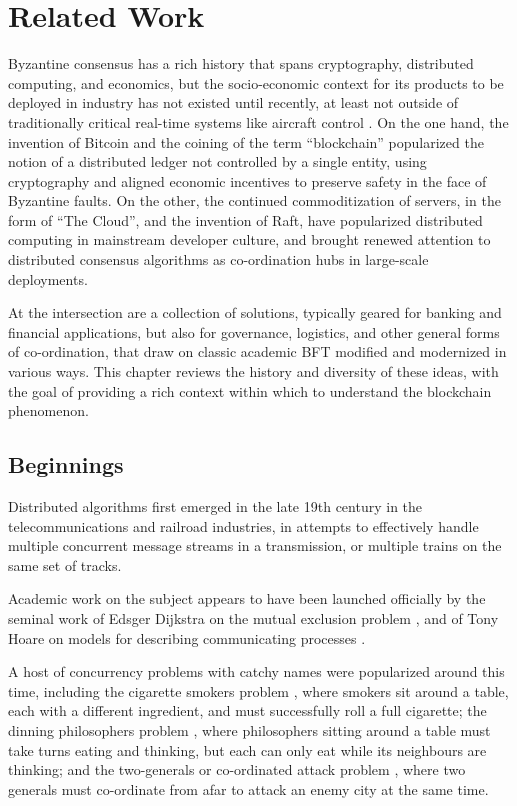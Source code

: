 \chapter{Related Work}
\label{ch:related}

Byzantine consensus has a rich history that spans cryptography, distributed computing, and economics,
but the socio-economic context for its products to be deployed in industry has not existed until recently,
at least not outside of traditionally critical real-time systems like aircraft control \cite{draper_lab}.
On the one hand, the invention of Bitcoin and the coining of the term ``blockchain'' popularized the notion
of a distributed ledger not controlled by a single entity, using cryptography and aligned economic incentives to 
preserve safety in the face of Byzantine faults.
On the other, the continued commoditization of servers, in the form of ``The Cloud'', and the invention of Raft, 
have popularized distributed computing in mainstream developer culture, 
and brought renewed attention to distributed consensus algorithms as co-ordination hubs in large-scale deployments. 

At the intersection are a collection of solutions, typically geared for banking and financial applications,
but also for governance, logistics, and other general forms of co-ordination, 
that draw on classic academic BFT modified and modernized in various ways.
This chapter reviews the history and diversity of these ideas, with the goal of providing a rich context within which to 
understand the blockchain phenomenon.

\section{Beginnings}

Distributed algorithms first emerged in the late 19th century in the telecommunications and railroad industries,
in attempts to effectively handle multiple concurrent message streams in a transmission, 
or multiple trains on the same set of tracks.

Academic work on the subject appears to have been launched officially by the seminal work
of Edsger Dijkstra on the mutual exclusion problem \cite{mutex}, and
of Tony Hoare on models for describing communicating processes \cite{csp}.

A host of concurrency problems with catchy names were popularized around this time,
including the cigarette smokers problem \cite{cigarette_smokers}, where smokers sit around a table, 
each with a different ingredient, and must successfully roll a full cigarette;
the dinning philosophers problem \cite{dining_philosophers},
where philosophers sitting around a table must take turns eating and thinking,
but each can only eat while its neighbours are thinking;
and the two-generals or co-ordinated attack problem \cite{gettier},
where two generals must co-ordinate from afar to attack an enemy city at the same time.

